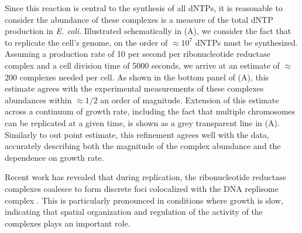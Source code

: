 Since this reaction is central to the synthesis of all dNTPs, it is reasonable
to consider the abundance of these complexes is a measure of the total dNTP
production in \textit{E. coli}. Illustrated schematically in 
(A), we consider the fact that to replicate the cell's genome, on the order of
$\approx 10^7$ dNTPs must be synthesized. Assuming a production rate of 10 per
second per ribonucleotide reductase complex and a cell division time of 5000
seconds, we arrive at an estimate of $\approx$ 200 complexes needed per cell. As
shown in the bottom panel of  (A), this estimate agrees with
the experimental measurements of these complexes abundances within $\approx 1/2$
an order of magnitude. Extension of this estimate across a continuum of growth
rate, including the fact that multiple chromosomes can be replicated at a given
time, is shown as a grey transparent line in (A). Similarly
to out point estimate, this refinement agrees well with the data, accurately
describing both the magnitude of the complex abundance and the dependence on
growth rate. 

Recent work has revealed that during replication, the ribonucleotide reductase
complexes coalesce to form discrete foci colocalized with the DNA replisome
complex \citep{sanchez-romero2011}. This is particularly pronounced in
conditions where growth is slow, indicating that spatial organization and
regulation of the activity of the complexes plays an important role.

